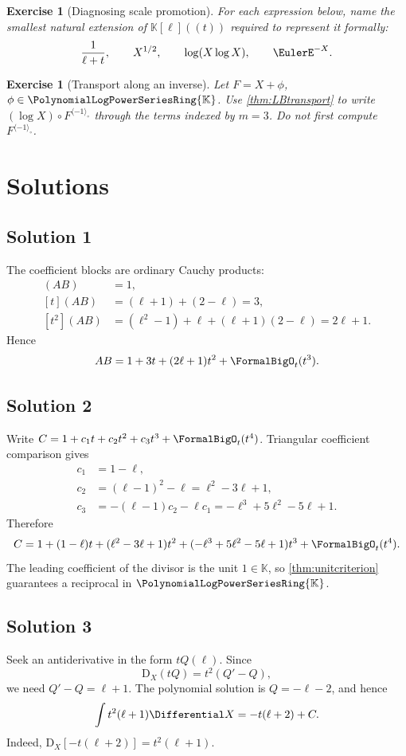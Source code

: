 \documentclass[11pt,oneside,openany]{book}
\newtheorem{exercise}[theorem]{Exercise}
\newcommand{\K}{\mathbb{K}}
\newcommand{\Rring}{\PolynomialLogPowerSeriesRing{\K}}
\newcommand{\compose}{\mathbin{\circ}}
\newcommand{\rev}{^{\langle-1\rangle_{\circ}}}
\newcommand{\D}{\mathrm{D}}
\begin{document}
\begin{exercise}[Diagnosing scale promotion]
For each expression below, name the smallest natural extension of
\(\K[\ell]((t))\) required to represent it formally:
\[
 \frac1{\ell+t},
 \qquad X^{1/2},
 \qquad \log(X\log X),
 \qquad \EulerE^{-X}.
\]
\end{exercise}

\begin{exercise}[Transport along an inverse]
Let \(F=X+\phi\), \(\phi\in\Rring\).  Use
\cref{thm:LBtransport} to write \((\log X)\compose F\rev\) through the
terms indexed by \(m=3\).  Do not first compute \(F\rev\).
\end{exercise}

\section{Solutions}

\subsection*{Solution 1}
The coefficient blocks are ordinary Cauchy products:
\begin{align*}
 [t^0](AB)&=1,\\
 [t](AB)&=(\ell+1)+(2-\ell)=3,\\
 [t^2](AB)&=(\ell^2-1)+\ell+(\ell+1)(2-\ell)=2\ell+1.
\end{align*}
Hence
\[
 AB=1+3t+(2\ell+1)t^2+\FormalBigO_t(t^3).
\]

\subsection*{Solution 2}
Write \(C=1+c_1t+c_2t^2+c_3t^3+\FormalBigO_t(t^4)\).  Triangular coefficient
comparison gives
\begin{align*}
 c_1&=1-\ell,\\
 c_2&=(\ell-1)^2-\ell=\ell^2-3\ell+1,\\
 c_3&=-(\ell-1)c_2-\ell c_1
 =-\ell^3+5\ell^2-5\ell+1.
\end{align*}
Therefore
\[
 C=1+(1-\ell)t+(\ell^2-3\ell+1)t^2
 +(-\ell^3+5\ell^2-5\ell+1)t^3+\FormalBigO_t(t^4).
\]
The leading coefficient of the divisor is the unit \(1\in\K\), so
\cref{thm:unitcriterion} guarantees a reciprocal in \(\Rring\).

\subsection*{Solution 3}
Seek an antiderivative in the form \(tQ(\ell)\).  Since
\[
 \D_X(tQ)=t^2(Q'-Q),
\]
we need \(Q'-Q=\ell+1\).  The polynomial solution is
\(Q=-\ell-2\), and hence
\[
 \int t^2(\ell+1)\Differential X=-t(\ell+2)+C.
\]
Indeed,
\(\D_X[-t(\ell+2)]=t^2(\ell+1)\).
\end{document}
